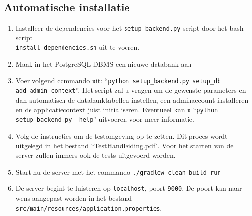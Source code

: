 \documentclass[a4paper,11pt]{article}
\begin{document}
	\subsection*{Automatische installatie}
	\begin{enumerate}
		\item Installeer de dependencies voor het \texttt{setup\_backend.py} script door het bash-script\\ \texttt{install\_dependencies.sh} uit te voeren.
		\item Maak in het PostgreSQL DBMS een nieuwe databank aan
		\item Voer volgend commando uit: ``\texttt{python setup\_backend.py setup\_db add\_admin context}''. Het script zal u vragen om de gewenste parameters en dan automatisch de databanktabellen instellen, een adminaccount installeren en de applicatiecontext juist initialiseren. Eventueel kan u ``\texttt{python setup\_backend.py --help}'' uitvoeren voor meer informatie.
		\item Volg de instructies om de testomgeving op te zetten. Dit proces wordt uitgelegd in het bestand ``\href{run:TestHandleiding.pdf}{TestHandleiding.pdf}". Voor het starten van de server zullen immers ook de tests uitgevoerd worden.
		\item Start nu de server met het commando \texttt{./gradlew clean build run}
		\item De server begint te luisteren op \texttt{localhost}, poort \texttt{9000}. De poort kan naar wens aangepast worden in het bestand \texttt{src/main/resources/application.properties}.
	\end{enumerate}
\end{document}
